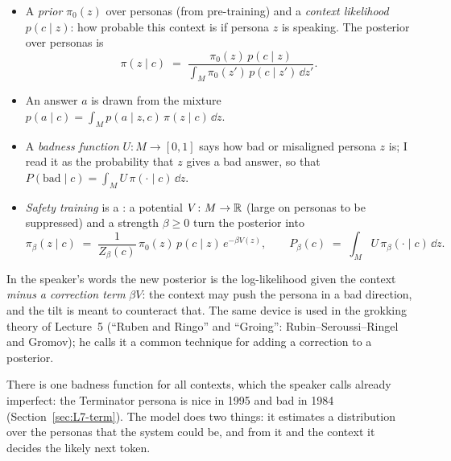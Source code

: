 \begin{defn}\label{def:L7-model}
\begin{itemize}
  \item A \emph{prior} $\pi_0(z)$ over personas (from pre-training) and a \emph{context likelihood} $p(c\mid z)$: how probable this context is if persona $z$ is speaking. The posterior over personas is
  \begin{equation}\label{eq:L7-post}
     \pi(z\mid c)\;=\;\frac{\pi_0(z)\,p(c\mid z)}{\int_M\pi_0(z')\,p(c\mid z')\,\dd z'}.
  \end{equation}
  \item An answer $a$ is drawn from the mixture $p(a\mid c)=\int_M p(a\mid z,c)\,\pi(z\mid c)\,\dd z$.
  \item A \emph{badness function} $U\colon M\to[0,1]$ says how bad or misaligned persona $z$ is; I read it as the probability that $z$ gives a bad answer, so that $P(\mathrm{bad}\mid c)=\int_M U\,\pi(\cdot\mid c)\,\dd z$.
  \item \emph{Safety training} is a : a potential $V\colon M\to\mathbb{R}$ (large on personas to be suppressed) and a strength $\beta\ge0$ turn the posterior into
  \begin{equation}\label{eq:L7-tilt}
     \pi_\beta(z\mid c)\;=\;\frac{1}{Z_\beta(c)}\,\pi_0(z)\,p(c\mid z)\,e^{-\beta V(z)},\qquad
     P_\beta(c)\;=\;\int_M U\,\pi_\beta(\cdot\mid c)\,\dd z .
  \end{equation}
\end{itemize}
\end{defn}
In the speaker's words the new posterior is the log-likelihood given the context \emph{minus a correction term} $\beta V$: the context may push the persona in a bad direction, and the tilt is meant to counteract that. The same device is used in the grokking theory of Lecture~5 (``Ruben and Ringo'' and ``Groing'': Rubin--Seroussi--Ringel and Gromov); he calls it a common technique for adding a correction to a posterior.

There is one badness function for all contexts, which the speaker calls already imperfect: the Terminator persona is nice in 1995 and bad in 1984 (Section~\ref{sec:L7-term}). The model does two things: it estimates a distribution over the personas that the system could be, and from it and the context it decides the likely next token.

